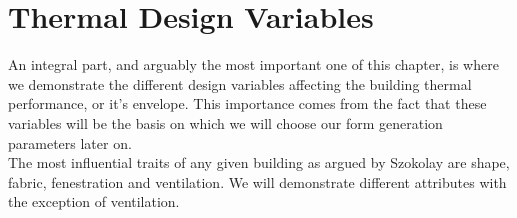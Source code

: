 \section{Thermal Design Variables}
An integral part, and arguably the most important one of this chapter, is where we demonstrate the
different design variables affecting the building thermal performance, or it's envelope. This
importance comes from the fact that these variables will be the basis on which we will choose our
form generation parameters later on.\\
The most influential traits of any given building as argued by Szokolay \cite{szokolay08} are shape,
fabric, fenestration and ventilation. We will demonstrate different attributes with the exception of
ventilation.\\ \vspace{0.5cm}
